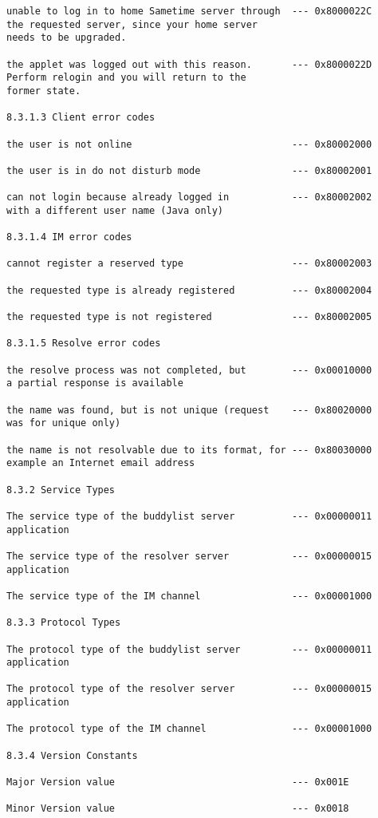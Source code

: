 \documentclass[titlepage,oneside]{book}
\begin{document}
\begin{verbatim}
unable to log in to home Sametime server through  --- 0x8000022C
the requested server, since your home server
needs to be upgraded.

the applet was logged out with this reason.       --- 0x8000022D
Perform relogin and you will return to the
former state.

8.3.1.3 Client error codes

the user is not online                            --- 0x80002000

the user is in do not disturb mode                --- 0x80002001

can not login because already logged in           --- 0x80002002
with a different user name (Java only)

8.3.1.4 IM error codes

cannot register a reserved type                   --- 0x80002003

the requested type is already registered          --- 0x80002004

the requested type is not registered              --- 0x80002005

8.3.1.5 Resolve error codes

the resolve process was not completed, but        --- 0x00010000
a partial response is available

the name was found, but is not unique (request    --- 0x80020000
was for unique only)

the name is not resolvable due to its format, for --- 0x80030000
example an Internet email address

8.3.2 Service Types

The service type of the buddylist server          --- 0x00000011
application

The service type of the resolver server           --- 0x00000015
application

The service type of the IM channel                --- 0x00001000

8.3.3 Protocol Types

The protocol type of the buddylist server         --- 0x00000011
application

The protocol type of the resolver server          --- 0x00000015
application

The protocol type of the IM channel               --- 0x00001000

8.3.4 Version Constants

Major Version value                               --- 0x001E

Minor Version value                               --- 0x0018


\end{verbatim}
\end{document}
